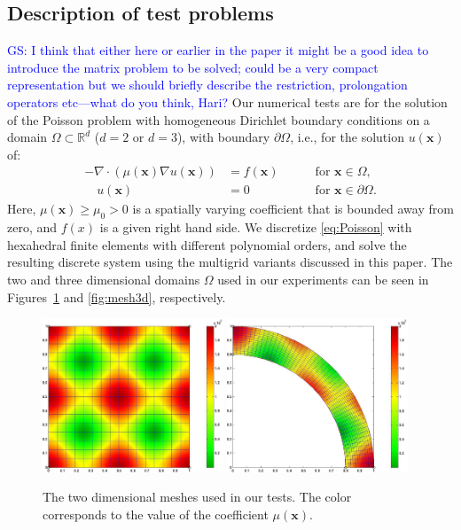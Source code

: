 \documentclass[smallcondensed,final]{svjour3}     %
\newcommand{\gsnote}[1]{\textcolor{blue}{GS: #1}}
\newcommand{\bs}[1]{\ensuremath{\boldsymbol #1}}
\begin{document}
\subsection{Description of test problems}\label{subsec:tests}
\gsnote{I think that either here or earlier in the paper it might be a
  good idea to introduce the matrix problem to be solved; could be a
  very compact representation but we should briefly describe the
  restriction, prolongation operators etc---what do you think, Hari?}
Our numerical tests are for the solution of the Poisson problem with
homogeneous Dirichlet boundary conditions on a domain
$\Omega\subset\mathbb R^d$ ($d=2$ or $d=3$), with boundary $\partial
\Omega$, i.e., for the solution $u(\bs x)$ of:
\begin{equation}\label{eq:Poisson}
  \begin{aligned}
    -\nabla\cdot\left(\mu(\bs x)\nabla u(\bs x)\right) &= f(\bs x) \quad &&\text{ for } \bs x\in \Omega,\\
    \quad u(\bs x)& = 0  \quad &&\text{ for } \bs x\in \partial\Omega.
  \end{aligned}
\end{equation}
Here, $\mu(\bs x)\ge \mu_0>0$ is a spatially varying coefficient that
is bounded away from zero, and $f(x)$ is a given right hand side. We
discretize \eqref{eq:Poisson} with hexahedral finite elements with
different polynomial orders, and solve the resulting discrete system
using the multigrid variants discussed in this paper. The two and
three dimensional domains $\Omega$ used in our experiments can be seen
in Figures~\ref{fig:mesh2d} and \ref{fig:mesh3d}, respectively.
%
\begin{figure}
	\includegraphics[width=0.48\textwidth]{figs/box}
	\includegraphics[width=0.48\textwidth]{figs/fan}
	\caption{\label{fig:mesh2d} The two dimensional meshes used in
          our tests. The color corresponds to the value of the
          coefficient $\mu(\bs x)$.}
\end{figure}
\end{document}
